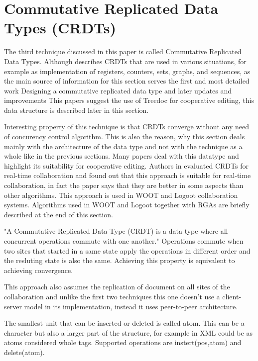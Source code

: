 \documentclass[12pt,oneside]{fithesis2}
\begin{document}
\section{Commutative Replicated Data Types (CRDTs)}
\par The third technique discussed in this paper is called Commutative Replicated Data Types. Although \cite{Shapiro-long} describes CRDTs that are used in various situations, for example as implementation of registers, counters, sets, graphs, and sequences, as the main source of information for this section serves the first and most detailed work Designing a commutative replicated data type \cite{Shapiro-design} and later updates and improvements \cite{Shapiro-editing} \cite{Shapiro-consistency} This papers suggest the use of Treedoc for cooperative editing, this data structure is described later in this section. 
\par Interesting property of this technique is that CRDTs converge without any need of concurency control algorithm. This is also the reason, why this section deals mainly with the architecture of the data type and not with the technique as a whole like in the previous sections. Many papers deal with this datatype and highlight its suitability for cooperative editing. Authors in \cite{CRDT-real} evaluated CRDTs for real-time collaboration and found out that this approach is suitable for real-time collaboration, in fact the paper says that they are better in some aspects than other algorithms. This approach is used in WOOT \cite{WOOT} and Logoot \cite{Logoot} collaboration systems. Algorithms used in WOOT and Logoot together with RGAs \cite{RGA} are briefly described at the end of this section.
\par "A Commutative Replicated Data Type (CRDT) is a data type where all concurrent operations commute with one another." \cite{Shapiro-design} Operations commute when two sites that started in a same state apply the operations in different order and the resluting state is also the same. Achieving this property is equivalent to achieving convergence.
\par This approach also assumes the replication of document on all sites of the collaboration and unlike the first two techniques this one doesn't use a client-server model in its implementation, instead it uses peer-to-peer architecture.
\par The smallest unit that can be inserted or deleted is called atom. This can be a character but also a larger part of the structure, for example in XML could be as atoms considered whole tags. Supported operations are instert(pos,atom) and delete(atom). 
\end{document}

